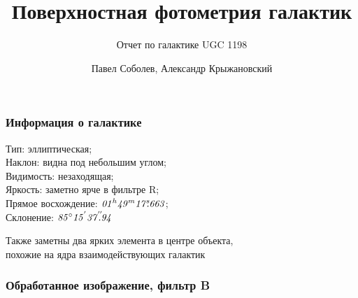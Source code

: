 \documentclass[aspectratio=169, hyperref={bookmarks=false}]{beamer}
\title{Поверхностная фотометрия галактик}
\subtitle{Отчет по галактике UGC 1198}
\author{Павел Соболев, Александр Крыжановский}
\date{}
\begin{document}
\frame{\titlepage}

\begin{frame}
 \frametitle{Информация о галактике}
 
    \vspace{-1cm}
    Тип: эллиптическая; \\
    Наклон: видна под небольшим углом; \\
    Видимость: незаходящая; \\
    Яркость: заметно ярче в фильтре R; \\
    Прямое восхождение: $ \textit{01}^{\hspace{1pt}h} \textit{49}^{\hspace{1pt}m} \textit{17}^{\hspace{1pt}s}\hspace{-4pt}\textit{.663} $; \\
    Склонение: $ \textit{85}^{\hspace{1pt}\circ} \textit{15}^{\hspace{1pt}'} \textit{37}^{\hspace{1pt}''}\hspace{-5pt}\textit{.94} $ \par
    
    \vspace{\baselineskip}
    Также заметны два ярких элемента в центре объекта, \\
    похожие на ядра взаимодействующих галактик
 
\end{frame}


\begin{frame}
\frametitle{Обработанное изображение, фильтр B}

    \begin{minipage}[h]{\linewidth} 
    \end{minipage}

\end{frame}
\end{document}
